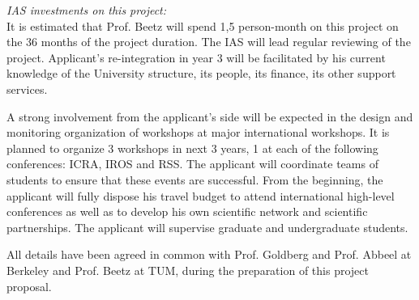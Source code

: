 \emph{IAS investments on this project:}\\
It is estimated  that Prof. Beetz will spend  1,5 person-month on this
project on the 36 months of  the project duration. The IAS will lead
regular  reviewing of the  project. Applicant's re-integration
in  year  3  will  be  facilitated  by his  current  knowledge  of  the
University  structure,  its people,  its  finance,  its other  support
services.


A strong involvement from the applicant's side will be expected in the design
and  monitoring  organization   of  workshops at  major international
workshops. It is planned to organize 3 workshops in next 3 years, 1 at each of the
following conferences: ICRA, IROS and RSS. The applicant  will  coordinate  teams of
students  to  ensure  that  these  events are  successful.   From  the
beginning,  the applicant will fully  dispose his  travel budget  to attend
international  high-level conferences  as well  as to  develop  his own
scientific  network  and scientific  partnerships.   The applicant will  supervise
graduate and undergraduate students.

All details  have been agreed in  common with Prof. Goldberg and Prof. Abbeel  
at Berkeley and Prof. Beetz at TUM, during the preparation of this project proposal.



